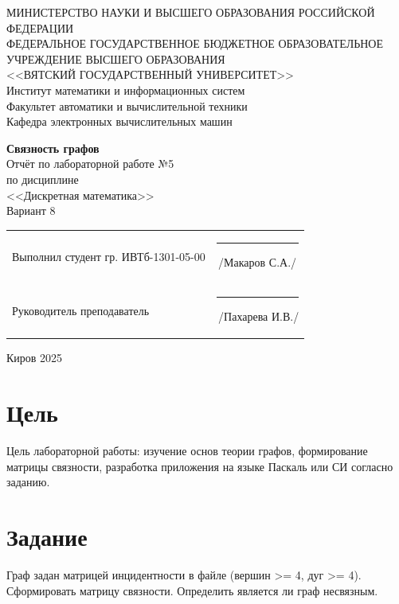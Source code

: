 \documentclass[a4paper,14pt]{extarticle}
\begin{document}
  \newpage\thispagestyle{empty}
  \begin{center}
    \MakeUppercase{
      Министерство науки и высшего образования Российской Федерации\\
      Федеральное государственное бюджетное образовательное учреждение высшего образования\\
      <<Вятский Государственный Университет>>\\
    }
    Институт математики и информационных систем\\
    Факультет автоматики и вычислительной техники\\
    Кафедра электронных вычислительных машин
  \end{center}
  \vfill

  \begin{center}
    \textbf{Связность графов}\\
    Отчёт по лабораторной работе №5\\
    по дисциплине\\
    <<Дискретная математика>>\\
    Вариант 8
  \end{center}
  \vfill

  \noindent
  \begin{tabular}{ll}
    Выполнил студент гр. ИВТб-1301-05-00 \hspace{5mm} &
    \rule[-1mm]{25mm}{0.10mm}\,/Макаров С.А./\\
    
    Руководитель преподаватель & \rule[-1mm]{25mm}{0.10mm}\,/Пахарева И.В./\\
  \end{tabular}

  \vfill
  \begin{center}
    Киров 2025
  \end{center}

  \newpage
  \section*{\hspace{12.5mm}Цель}
  Цель лабораторной работы: изучение основ теории графов, формирование матрицы связности, разработка приложения на языке Паскаль или СИ согласно заданию.

  \section*{\hspace{12.5mm}Задание}
  Граф задан матрицей инцидентности в файле (вершин >= 4, дуг >= 4). Сформировать матрицу связности. Определить является ли граф несвязным.
\end{document}
